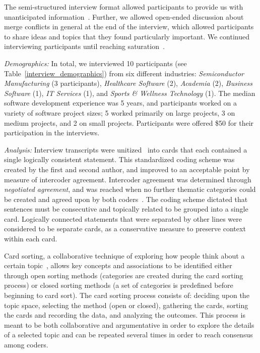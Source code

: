 The semi-structured interview format allowed participants to provide us with unanticipated information~\cite{seaman2008qualitative}. Further, we allowed open-ended discussion about merge conflicts in general at the end of the interview, which allowed participants to share ideas and topics that they found particularly important. We continued interviewing participants until reaching saturation~\cite{fusch2015we}.

\textit{Demographics:} In total, we interviewed 10 participants (see Table~\ref{interview_demographics}) from six different industries: \textit{Semiconductor Manufacturing} (3 participants), \textit{Healthcare Software} (2), \textit{Academia} (2), \textit{Business Software} (1), \textit{IT Services} (1), and \textit{Sports \& Wellness Technology} (1). The median software development experience was 5 years, and participants worked on a variety of software project sizes; 5 worked primarily on large projects, 3 on medium projects, and 2 on small projects. Participants were offered \$50 for their participation in the interviews.

\textit{Analysis:} Interview transcripts were unitized~\cite{unitization} into cards that each contained a single logically consistent statement. This standardized coding scheme was created by the first and second author, and improved to an acceptable point by measure of intercoder agreement.
Intercoder agreement was determined through \textit{negotiated agreement}, and was reached when no further thematic categories could be created and agreed upon by both coders~\cite{garrison2006revisiting}\cite{ritchie2013qualitative}.
The coding scheme dictated that sentences must be consecutive and topically related to be grouped into a single card. Logically connected statements that were separated by other lines were considered to be separate cards, as a conservative measure to preserve context within each card.

Card sorting, a collaborative technique of exploring how people think about a certain topic~\cite{spencer2009card}\cite{card_sort},  allows key concepts and associations to be identified either through open sorting methods (categories are created during the card sorting process) or closed sorting methods (a set of categories is predefined before beginning to card sort).
The card sorting process consists of: deciding upon the topic space, selecting the method (open or closed), gathering the cards, sorting the cards and recording the data, and analyzing the outcomes.
This process is meant to be both collaborative and argumentative in order to explore the details of a selected topic and can be repeated several times in order to reach consensus among coders.

